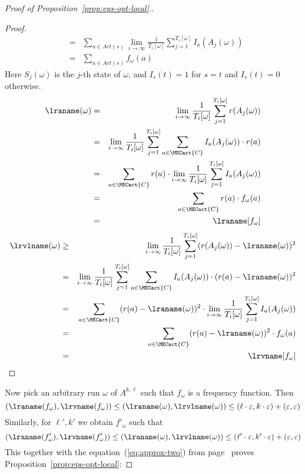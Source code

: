 \begin{proof}[Proof of Proposition~\ref{prop:eps-opt-local}.]
\begin{proof}
\begin{eqnarray*}
& = & \sum_{a\in \mathit{Act}(s)}\lim_{i\rightarrow \infty} \frac{1}{T_i[\omega]}\sum_{j=1}^{T_i[\omega]}  I_a(A_j(\omega)) \\
& = & \sum_{a\in \mathit{Act}(s)} f_{\omega}(a)
\end{eqnarray*}
Here $S_j(\omega)$ is the $j$-th state of $\omega$, and $I_s(t)=1$ for $s=t$ and $I_s(t)=0$ otherwise.
\begin{eqnarray*}
\lraname(\omega) & = & \lim_{i\rightarrow \infty} \frac{1}{T_i[\omega]} \sum_{j=1}^{T_i[\omega]} r(A_j(\omega)) \\
& = & \lim_{i\rightarrow \infty} \frac{1}{T_i[\omega]} \sum_{j=1}^{T_i[\omega]} \sum_{a\in \MECact{C}} I_a(A_j(\omega))\cdot r(a) \\
& = & \sum_{a\in \MECact{C}} r(a)\cdot \lim_{i\rightarrow \infty} \frac{1}{T_i[\omega]} \sum_{j=1}^{T_i[\omega]} I_a(A_j(\omega)) \\
& = & \sum_{a\in \MECact{C}} r(a)\cdot f_{\omega}(a)\\
& = & \lraname[f_{\omega}]
\end{eqnarray*}
\begin{eqnarray*}
\lrvlname(\omega) & \ge & \lim_{i\rightarrow \infty} \frac{1}{T_i[\omega]} \sum_{j=1}^{T_i[\omega]} (r(A_j(\omega))-\lraname(\omega))^2 \\
& = & \lim_{i\rightarrow \infty} \frac{1}{T_i[\omega]} \sum_{j=1}^{T_i[\omega]} \sum_{a\in \MECact{C}} I_a(A_j(\omega))\cdot (r(a)-\lraname(\omega))^2 \\
& = & \sum_{a\in \MECact{C}} (r(a)-\lraname(\omega))^2 \cdot \lim_{i\rightarrow \infty} \frac{1}{T_i[\omega]} \sum_{j=1}^{T_i[\omega]} I_a(A_j(\omega)) \\
& = & \sum_{a\in \MECact{C}} (r(a)-\lraname(\omega))^2 \cdot f_{\omega}(a)\\
& = & \lrvname[f_{\omega}]
\end{eqnarray*}
\end{proof}
\noindent
Now pick an arbitrary run $\omega$ of $A^{k,\ell}$ such that $f_{\omega}$ is a frequency function. Then
\[
(\lraname(f_{\omega}),\lrvname(f_{\omega}))\le(\lraname(\omega),\lrvlname(\omega))\leq (\ell\cdot \varepsilon,k\cdot\varepsilon)+(\varepsilon,\varepsilon)
\]
Similarly, for $\ell',k'$ we obtain $f'_{\omega}$ such that 
\[
(\lraname(f'_{\omega}),\lrvname(f'_{\omega}))\le(\lraname(\omega),\lrvlname(\omega))\leq (\ell'\cdot \varepsilon,k'\cdot\varepsilon)+(\varepsilon,\varepsilon)
\]
This together with the equation~(\ref{eq:approx-two}) from page~\pageref{eq:approx-two} proves Proposition~\ref{prop:eps-opt-local}:

\end{proof}
